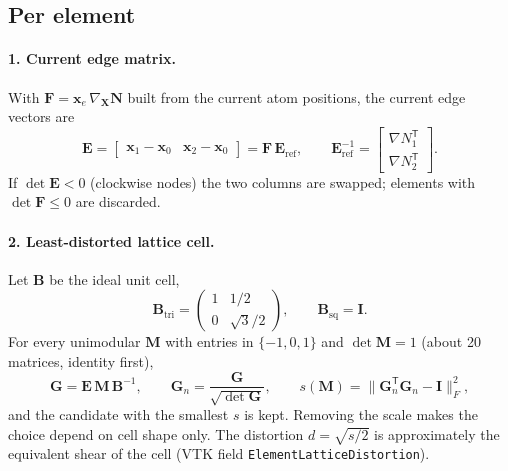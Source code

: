 \documentclass[11pt,a4paper]{article}
\newcommand{\T}{^{\mathsf T}}
\newcommand{\code}[1]{\texttt{#1}}
\begin{document}
\subsection{Per element}

\paragraph{1. Current edge matrix.} With $\mathbf{F} = \mathbf{x}_e\,\nabla_{\mathbf{X}}\mathbf{N}$ built from the current atom positions, the current edge vectors are
\begin{equation}
  \mathbf{E} = \begin{bmatrix} \mathbf{x}_1 - \mathbf{x}_0 & \mathbf{x}_2 - \mathbf{x}_0 \end{bmatrix}
  = \mathbf{F}\,\mathbf{E}_{\text{ref}},
  \qquad
  \mathbf{E}_{\text{ref}}^{-1} = \begin{bmatrix} \nabla N_1\T \\ \nabla N_2\T \end{bmatrix}.
\end{equation}
If $\det\mathbf{E} < 0$ (clockwise nodes) the two columns are swapped; elements with $\det\mathbf{F} \le 0$ are discarded.

\paragraph{2. Least-distorted lattice cell.} Let $\mathbf{B}$ be the ideal unit cell,
\begin{equation}
  \mathbf{B}_{\text{tri}} = \begin{pmatrix} 1 & 1/2 \\ 0 & \sqrt{3}/2 \end{pmatrix}, \qquad \mathbf{B}_{\text{sq}} = \mathbf{I}.
\end{equation}
For every unimodular $\mathbf{M}$ with entries in $\{-1,0,1\}$ and $\det\mathbf{M} = 1$ (about 20 matrices, identity first),
\begin{equation}
  \mathbf{G} = \mathbf{E}\,\mathbf{M}\,\mathbf{B}^{-1}, \qquad
  \mathbf{G}_n = \frac{\mathbf{G}}{\sqrt{\det\mathbf{G}}}, \qquad
  s(\mathbf{M}) = \big\| \mathbf{G}_n\T \mathbf{G}_n - \mathbf{I} \big\|_F^2,
\end{equation}
and the candidate with the smallest $s$ is kept. Removing the scale makes the choice depend on cell shape only. The distortion $d = \sqrt{s/2}$ is approximately the equivalent shear of the cell (VTK field \code{ElementLatticeDistortion}).
\end{document}
